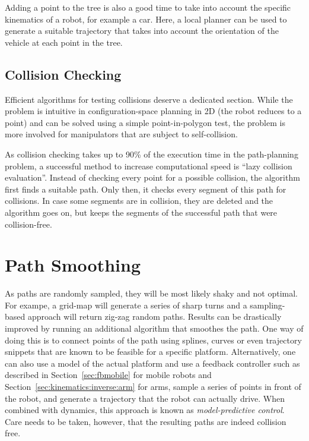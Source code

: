 Adding a point to the tree is also a good time to take into account the specific kinematics of a robot, for example a car. Here, a local planner can be used to generate a suitable trajectory that takes into account the orientation of the vehicle at each point in the tree.

\subsection{Collision Checking}
Efficient algorithms for testing collisions deserve a dedicated section. While the problem is intuitive in configuration-space planning in 2D (the robot reduces to a point) and can be solved using a simple point-in-polygon test, the problem is more involved for manipulators that are subject to self-collision.

As collision checking takes up to 90\% of the execution time in the path-planning problem, a successful method to increase computational speed is ``lazy collision evaluation''. Instead of checking every point for a possible collision, the algorithm first finds a suitable path. Only then, it checks every segment of this path for collisions. In case some segments are in collision, they are deleted and the algorithm goes on, but keeps the segments of the successful path that were collision-free.

\section{Path Smoothing}
As paths are randomly sampled, they will be most likely shaky and not optimal. For exampe, a grid-map will generate a series of sharp turns and a sampling-based approach will return zig-zag random paths. Results can be drastically improved by running an additional algorithm that smoothes the path. One way of doing this is to connect points of the path using splines, curves or even trajectory snippets that are known to be feasible for a specific platform. Alternatively, one can also use a model of the actual platform and use a feedback controller such as described in Section~\ref{sec:fbmobile} for mobile robots and Section~\ref{sec:kinematics:inverse:arm} for arms, sample a series of points in front of the robot, and generate a trajectory that the robot can actually drive. When combined with dynamics, this approach is known as \textsl{model-predictive control}. Care needs to be taken, however, that the resulting paths are indeed collision free.

